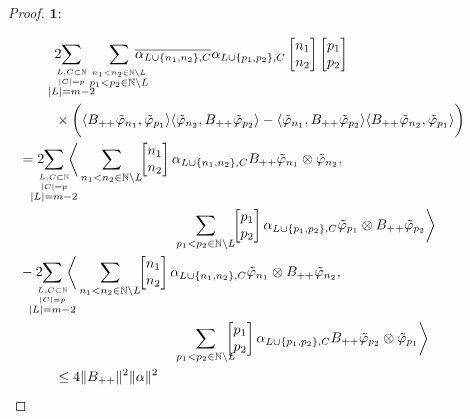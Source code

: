 \documentclass[b5paper,draft,openbib,12pt]{memoir}
\begin{document}
\begin{proof}
\(\boldsymbol{1:}\) 

\begin{align}
  &2\hspace{-0.4cm}\sum_{\overset{L,C\subset \mathbb{N}}{\overset{|C|=p}{|L|=m-2}}}\hspace{-0.2cm}\sum_{\overset{n_1<n_2\in\mathbb{N}\backslash L }{p_1<p_2\in\mathbb{N}\backslash L }}
  \hspace{-0.4cm}\overline{\alpha_{L\cup\{n_1,n_2\},C}}\alpha_{L\cup\{p_1,p_2\},C}
\left[\begin{matrix}n_1\\n_2\end{matrix}\right]\left[\begin{matrix}p_1\\p_2\end{matrix}\right]\\
    &\times \bigg(
    \langle  B_{++}\tilde{\varphi}_{n_1},\tilde{\varphi}_{p_1} \rangle \langle  \tilde{\varphi}_{n_2}, B_{++}\tilde{\varphi}_{p_2}\rangle
    -\langle \tilde{\varphi}_{n_1},B_{++}\tilde{\varphi}_{p_2} \rangle \langle B_{++} \tilde{\varphi}_{n_2}, \tilde{\varphi}_{p_1}\rangle\bigg)\\
    &\hspace{-0.9cm}= 2 \!\!\!\!\!\!\!\sum_{\overset{L,C\subset \mathbb{N}}{\overset{|C|=p}{|L|=m-2}}}\!\!\!\!\!\bigg\langle \sum_{n_1<n_2\in\mathbb{N}\backslash L}
    \!\!\left[\begin{matrix}n_1\\n_2\end{matrix}\right]\alpha_{L\cup\{n_1,n_2\},C} B_{++}\tilde{\varphi}_{n_1}\otimes \tilde{\varphi}_{n_2}, \\
    &\hspace{3cm}\sum_{p_1<p_2\in\mathbb{N}\backslash L}\!\!\left[\begin{matrix}p_1\\p_2\end{matrix}\right]\alpha_{L\cup\{p_1,p_2\},C} \tilde{\varphi}_{p_1}\otimes B_{++}\tilde{\varphi}_{p_2}\bigg\rangle\\
    &\hspace{-0.9cm}-2 \!\!\!\!\!\!\!\sum_{\overset{L,C\subset \mathbb{N}}{\overset{|C|=p}{|L|=m-2}}}\!\!\!\!\!\bigg\langle \sum_{n_1<n_2\in\mathbb{N}\backslash L}
    \!\!\left[\begin{matrix}n_1\\n_2\end{matrix}\right]\alpha_{L\cup\{n_1,n_2\},C} \tilde{\varphi}_{n_1}\otimes B_{++}\tilde{\varphi}_{n_2}, \\
    &\hspace{3cm}\sum_{p_1<p_2\in\mathbb{N}\backslash L}\!\!\!\!\!\left[\begin{matrix}p_1\\p_2\end{matrix}\right]\alpha_{L\cup\{p_1,p_2\},C} B_{++}\tilde{\varphi}_{p_2}\otimes \tilde{\varphi}_{p_1}\bigg\rangle\\
    &\le 4 \|B_{++}\|^2 \|\alpha\|^2
\end{align}


\end{proof}
\end{document}
